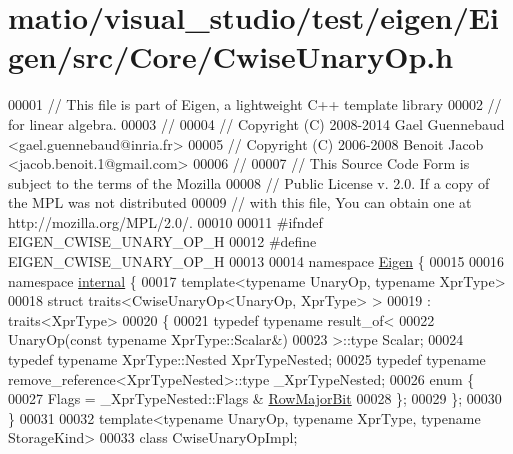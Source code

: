 \hypertarget{matio_2visual__studio_2test_2eigen_2_eigen_2src_2_core_2_cwise_unary_op_8h_source}{}\section{matio/visual\+\_\+studio/test/eigen/\+Eigen/src/\+Core/\+Cwise\+Unary\+Op.h}
\label{matio_2visual__studio_2test_2eigen_2_eigen_2src_2_core_2_cwise_unary_op_8h_source}

\begin{DoxyCode}
00001 \textcolor{comment}{// This file is part of Eigen, a lightweight C++ template library}
00002 \textcolor{comment}{// for linear algebra.}
00003 \textcolor{comment}{//}
00004 \textcolor{comment}{// Copyright (C) 2008-2014 Gael Guennebaud <gael.guennebaud@inria.fr>}
00005 \textcolor{comment}{// Copyright (C) 2006-2008 Benoit Jacob <jacob.benoit.1@gmail.com>}
00006 \textcolor{comment}{//}
00007 \textcolor{comment}{// This Source Code Form is subject to the terms of the Mozilla}
00008 \textcolor{comment}{// Public License v. 2.0. If a copy of the MPL was not distributed}
00009 \textcolor{comment}{// with this file, You can obtain one at http://mozilla.org/MPL/2.0/.}
00010 
00011 \textcolor{preprocessor}{#ifndef EIGEN\_CWISE\_UNARY\_OP\_H}
00012 \textcolor{preprocessor}{#define EIGEN\_CWISE\_UNARY\_OP\_H}
00013 
00014 \textcolor{keyword}{namespace }\hyperlink{namespace_eigen}{Eigen} \{ 
00015 
00016 \textcolor{keyword}{namespace }\hyperlink{namespaceinternal}{internal} \{
00017 \textcolor{keyword}{template}<\textcolor{keyword}{typename} UnaryOp, \textcolor{keyword}{typename} XprType>
00018 \textcolor{keyword}{struct }traits<CwiseUnaryOp<UnaryOp, XprType> >
00019  : traits<XprType>
00020 \{
00021   \textcolor{keyword}{typedef} \textcolor{keyword}{typename} result\_of<
00022                      UnaryOp(\textcolor{keyword}{const} \textcolor{keyword}{typename} XprType::Scalar&)
00023                    >::type Scalar;
00024   \textcolor{keyword}{typedef} \textcolor{keyword}{typename} XprType::Nested XprTypeNested;
00025   \textcolor{keyword}{typedef} \textcolor{keyword}{typename} remove\_reference<XprTypeNested>::type \_XprTypeNested;
00026   \textcolor{keyword}{enum} \{
00027     Flags = \_XprTypeNested::Flags & \hyperlink{group__flags_gae4f56c2a60bbe4bd2e44c5b19cbe8762}{RowMajorBit} 
00028   \};
00029 \};
00030 \}
00031 
00032 \textcolor{keyword}{template}<\textcolor{keyword}{typename} UnaryOp, \textcolor{keyword}{typename} XprType, \textcolor{keyword}{typename} StorageKind>
00033 \textcolor{keyword}{class }CwiseUnaryOpImpl;

\end{DoxyCode}
